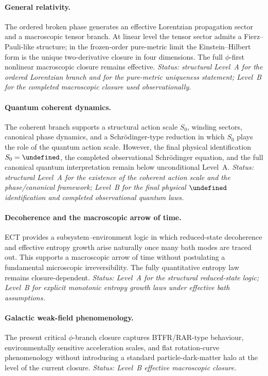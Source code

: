 \documentclass[11pt,a4paper]{article}
\let\hbar\undefined
\numberwithin{equation}{section}
\begin{document}
\paragraph{General relativity.}
The ordered broken phase generates an effective Lorentzian propagation
sector and a macroscopic tensor branch.
At linear level the tensor sector admits a Fierz--Pauli-like structure;
in the frozen-order pure-metric limit the Einstein--Hilbert form is the
unique two-derivative closure in four dimensions.
The full $\phi$-first nonlinear macroscopic closure remains effective.
\emph{Status: structural Level~A for the ordered Lorentzian branch and
for the pure-metric uniqueness statement; Level~B for the completed
macroscopic closure used observationally.}

\paragraph{Quantum coherent dynamics.}
The coherent branch supports a structural action scale $S_0$, winding
sectors, canonical phase dynamics, and a Schr\"odinger-type reduction in
which $S_0$ plays the role of the quantum action scale.
However, the final physical identification $S_0=\hbar$, the completed
observational Schr\"odinger equation, and the full canonical quantum
interpretation remain below unconditional Level~A.
\emph{Status: structural Level~A for the existence of the coherent
action scale and the phase/canonical framework; Level~B for the final
physical $\hbar$ identification and completed observational quantum
laws.}

\paragraph{Decoherence and the macroscopic arrow of time.}
ECT provides a subsystem--environment logic in which reduced-state
decoherence and effective entropy growth arise naturally once many bath
modes are traced out.
This supports a macroscopic arrow of time without postulating a
fundamental microscopic irreversibility.
The fully quantitative entropy law remains closure-dependent.
\emph{Status: Level~A for the structural reduced-state logic;
Level~B for explicit monotonic entropy growth laws under effective
bath assumptions.}

\paragraph{Galactic weak-field phenomenology.}
The present critical $\phi$-branch closure captures BTFR/RAR-type
behaviour, environmentally sensitive acceleration scales, and flat
rotation-curve phenomenology without introducing a standard
particle-dark-matter halo at the level of the current closure.
\emph{Status: Level~B effective macroscopic closure.}
\end{document}
